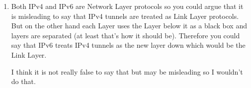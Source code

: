 \documentclass[12pt, a4paper]{article}
\begin{document}
\begin{enumerate}[1]
	\item %
	Both IPv4 and IPv6 are Network Layer protocols so you could argue that it is misleading to say that IPv4 tunnels are treated as Link Layer protocols. But on the other hand each Layer uses the Layer below it as a black box and layers are separated (at least that's how it should be). Therefore you could say that IPv6 treats IPv4 tunnels as the new layer down which would be the Link Layer.

	I think it is not really false to say that but may be misleading so I wouldn't do that.
\end{enumerate}
\end{document}
